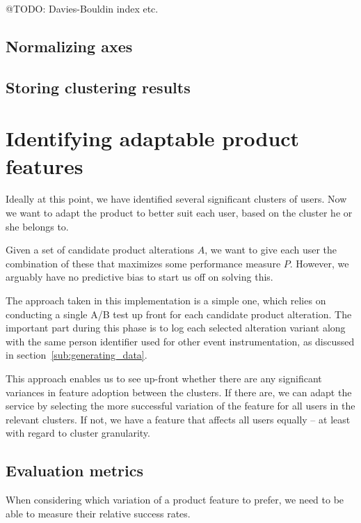 @TODO: Davies-Bouldin index etc.

\subsection{Normalizing axes}
\label{sub:normalizing_axes}

\subsection{Storing clustering results}
\label{sub:storing_results}

\section{Identifying adaptable product features}
\label{sec:identifying_adaptability}

Ideally at this point, we have identified several significant clusters of users. Now we want to adapt the product to better suit each user, based on the cluster he or she belongs to.

Given a set of candidate product alterations $A$, we want to give each user the combination of these that maximizes some performance measure $P$. However, we arguably have no predictive bias to start us off on solving this.

The approach taken in this implementation is a simple one, which relies on conducting a single A/B test up front for each candidate product alteration. The important part during this phase is to log each selected alteration variant along with the same person identifier used for other event instrumentation, as discussed in section~\ref{sub:generating_data}.

This approach enables us to see up-front whether there are any significant variances in feature adoption between the clusters. If there are, we can adapt the service by selecting the more successful variation of the feature for all users in the relevant clusters. If not, we have a feature that affects all users equally -- at least with regard to cluster granularity.

\subsection{Evaluation metrics} %
\label{sub:evaluation_metrics}

When considering which variation of a product feature to prefer, we need to be able to measure their relative success rates.

